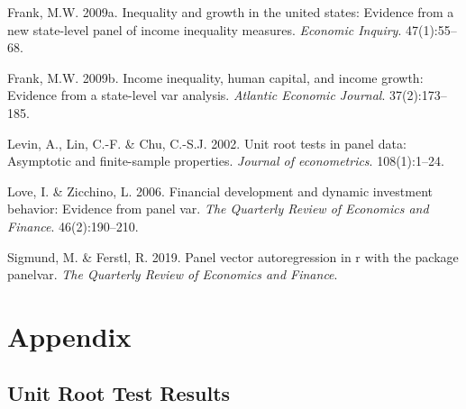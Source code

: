 \documentclass[11pt,preprint, authoryear]{elsarticle}
\numberwithin{equation}{section}
\numberwithin{figure}{section}
\numberwithin{table}{section}
\begin{document}
\leavevmode\hypertarget{ref-frank}{}%
Frank, M.W. 2009a. Inequality and growth in the united states: Evidence
from a new state-level panel of income inequality measures.
\emph{Economic Inquiry}. 47(1):55--68.

\leavevmode\hypertarget{ref-frankincome}{}%
Frank, M.W. 2009b. Income inequality, human capital, and income growth:
Evidence from a state-level var analysis. \emph{Atlantic Economic
Journal}. 37(2):173--185.

\leavevmode\hypertarget{ref-levin}{}%
Levin, A., Lin, C.-F. \& Chu, C.-S.J. 2002. Unit root tests in panel
data: Asymptotic and finite-sample properties. \emph{Journal of
econometrics}. 108(1):1--24.

\leavevmode\hypertarget{ref-love}{}%
Love, I. \& Zicchino, L. 2006. Financial development and dynamic
investment behavior: Evidence from panel var. \emph{The Quarterly Review
of Economics and Finance}. 46(2):190--210.

\leavevmode\hypertarget{ref-sigmund2019panel}{}%
Sigmund, M. \& Ferstl, R. 2019. Panel vector autoregression in r with
the package panelvar. \emph{The Quarterly Review of Economics and
Finance}.

\newpage

\hypertarget{appendix}{%
\section*{Appendix}\label{appendix}}

\hypertarget{unit-root-test-results}{%
\subsection{\texorpdfstring{Unit Root Test Results
\label{A}}{Unit Root Test Results }}\label{unit-root-test-results}}
\end{document}
